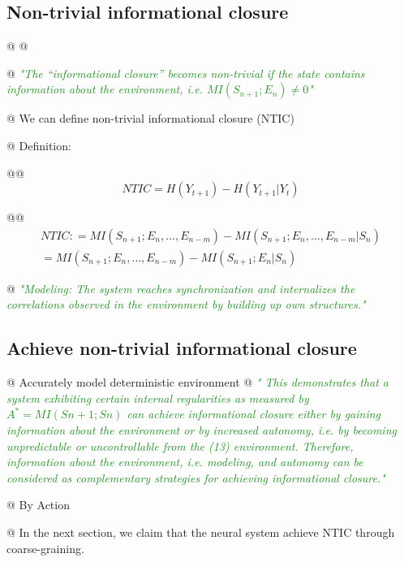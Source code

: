\documentclass[utf8]{article}
\newenvironment{ants}
			{
			 \begin{easylist}[itemize]
			}
			{
			\end{easylist}
			}
\newcommand{\rewrite}[1]{\textcolor{ForestGreen}{\textit{"#1"}}\newline}
\newcommand{\callforhelp}[1]{\todo[color=SpringGreen]{#1}}
\begin{document}
		
		
		\subsection*{Non-trivial informational closure}
			\begin{ants}
				
				@ \citep{BERTSCHINGER.2006}
				@ \citep{guttenberg2016neural}

				@ \rewrite{The “informational closure” becomes non-trivial if the state contains information about the environment, i.e. $MI(S_{n+1};E_{n})\neq0$}
	
				@ We can define non-trivial informational closure (NTIC)
				
				@ Definition:\callforhelp{Which def is better? }
				
					@@
					\begin{equation}
					N T I C = H ( Y _ { t + 1} ) - H ( Y _ { t + 1} | Y _ { t } )
					\end{equation}
					\citep{guttenberg2016neural}
					
					@@
					\begin{equation}
					\left.\begin{array}{l}{ N T I C  : = M I ( S _ { n + 1} ; E _ { n } ,\dots ,E _ { n - m } ) - M I ( S _ { n + 1} ; E _ { n } ,\dots ,E _ { n - m } | S _ { n } ) }\\{  = M I ( S _ { n + 1} ; E _ { n } ,\dots ,E _ { n - m } ) - M I ( S _ { n + 1} ; E _ { n } | S _ { n } ) }\end{array} \right.
					\end{equation}
					\cite{BERTSCHINGER.2006}
					
					
				@ \rewrite{Modeling: The system reaches synchronization and internalizes the correlations observed in the environment by building up own structures.}
				
			\end{ants}
		

		
		\subsection*{Achieve non-trivial informational closure}
			\begin{ants}

				@ Accurately model deterministic environment 
				@ \rewrite{
					This demonstrates that a system exhibiting certain internal regularities as measured by $A^* = MI(Sn+1; Sn)$ can achieve informational closure either by gaining information about the environment or by increased autonomy, i.e. by becoming unpredictable or uncontrollable from the (13) environment. Therefore, information about the environment, i.e. modeling, and autonomy can be considered as complementary strategies for achieving informational closure.}
				
				@ By Action 
				
				@ In the next section, we claim that the neural system achieve NTIC through coarse-graining.
				
			\end{ants}
\end{document}
